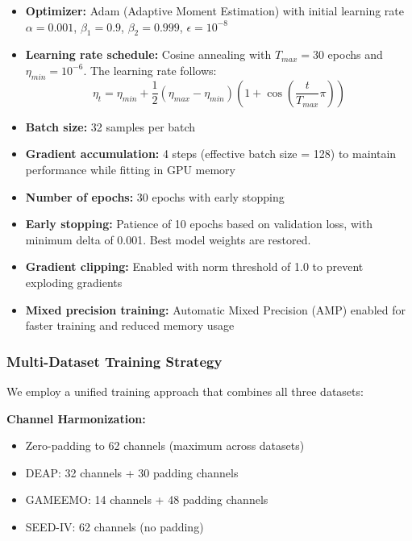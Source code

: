 \documentclass[conference]{IEEEtran}
\begin{document}
\begin{itemize}
    \item \textbf{Optimizer:} Adam (Adaptive Moment Estimation) with initial learning rate $\alpha = 0.001$, $\beta_1 = 0.9$, $\beta_2 = 0.999$, $\epsilon = 10^{-8}$
    
    \item \textbf{Learning rate schedule:} Cosine annealing with $T_{max} = 30$ epochs and $\eta_{min} = 10^{-6}$. The learning rate follows:
    \begin{equation}
    \eta_t = \eta_{min} + \frac{1}{2}(\eta_{max} - \eta_{min})\left(1 + \cos\left(\frac{t}{T_{max}}\pi\right)\right)
    \end{equation}
    
    \item \textbf{Batch size:} 32 samples per batch
    
    \item \textbf{Gradient accumulation:} 4 steps (effective batch size = 128) to maintain performance while fitting in GPU memory
    
    \item \textbf{Number of epochs:} 30 epochs with early stopping
    
    \item \textbf{Early stopping:} Patience of 10 epochs based on validation loss, with minimum delta of 0.001. Best model weights are restored.
    
    \item \textbf{Gradient clipping:} Enabled with norm threshold of 1.0 to prevent exploding gradients
    
    \item \textbf{Mixed precision training:} Automatic Mixed Precision (AMP) enabled for faster training and reduced memory usage
\end{itemize}

\subsubsection{Multi-Dataset Training Strategy}

We employ a unified training approach that combines all three datasets:

\textbf{Channel Harmonization:}
\begin{itemize}
    \item Zero-padding to 62 channels (maximum across datasets)
    \item DEAP: 32 channels + 30 padding channels
    \item GAMEEMO: 14 channels + 48 padding channels
    \item SEED-IV: 62 channels (no padding)
\end{itemize}
\end{document}
